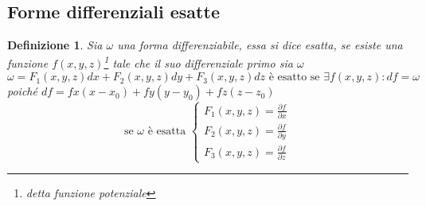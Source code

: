 \documentclass{book}
\newtheorem{defi}{Definizione}
\begin{document}
\subsection{Forme differenziali esatte}
\begin{defi}
	Sia $\omega$ una forma differenziabile, essa si dice {\color{red}esatta},
	se esiste una funzione $f(x,y,z)$\footnote{detta \color{red}funzione
	potenziale} tale che il suo differenziale primo sia $\omega$
	\begin{equation*}
		\omega=F_1(x,y,z)dx+F_2(x,y,z)dy+F_3(x,y,z)dz\text{ è esatto
		se }\exists f(x,y,z):df=\omega
	\end{equation*}
	poiché $df=fx(x-x_0)+fy(y-y_0)+fz(z-z_0)$
	\begin{equation*}
		\text{se $\omega$ è esatta }\begin{cases}
			F_1(x,y,z)=\frac{\partial f}{\partial x}\\
			F_2(x,y,z)=\frac{\partial f}{\partial y}\\
			F_3(x,y,z)=\frac{\partial f}{\partial z}
		\end{cases}
	\end{equation*}
\end{defi}
\end{document}
